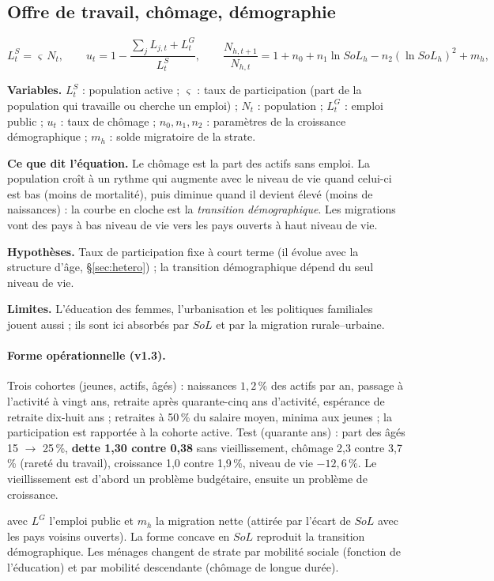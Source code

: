 \documentclass[11pt,a4paper]{article}
\newcommand{\variables}{\par\noindent\textbf{Variables.} }
\newcommand{\sens}{\par\noindent\textbf{Ce que dit l'équation.} }
\newcommand{\hyp}{\par\noindent\textbf{Hypothèses.} }
\newcommand{\limites}{\par\noindent\textbf{Limites.} }
\begin{document}
\subsection{Offre de travail, chômage, démographie}
\label{sec:demog}
\begin{equation}
L^S_t = \varsigma\, N_t, \qquad u_t = 1 - \frac{\sum_j L_{j,t} + L^G_t}{L^S_t}, \qquad
\frac{N_{h,t+1}}{N_{h,t}} = 1 + n_0 + n_1 \ln SoL_h - n_2 (\ln SoL_h)^2 + m_h ,
\end{equation}
\begin{lecture}
\variables $L^S_t$ : population active ; $\varsigma$ : taux de participation (part de la population qui travaille ou cherche un emploi) ; $N_t$ : population ; $L^G_t$ : emploi public ; $u_t$ : taux de chômage ; $n_0, n_1, n_2$ : paramètres de la croissance démographique ; $m_h$ : solde migratoire de la strate.
\sens Le chômage est la part des actifs sans emploi. La population croît à un rythme qui augmente avec le niveau de vie quand celui-ci est bas (moins de mortalité), puis diminue quand il devient élevé (moins de naissances) : la courbe en cloche est la \emph{transition démographique}. Les migrations vont des pays à bas niveau de vie vers les pays ouverts à haut niveau de vie.
\hyp Taux de participation fixe à court terme (il évolue avec la structure d'âge, \S\ref{sec:hetero}) ; la transition démographique dépend du seul niveau de vie.
\limites L'éducation des femmes, l'urbanisation et les politiques familiales jouent aussi ; ils sont ici absorbés par $SoL$ et par la migration rurale--urbaine.
\paragraph{Forme opérationnelle (v1.3).} Trois cohortes (jeunes, actifs, âgés) : naissances $1{,}2\,\%$ des actifs par an, passage à l'activité à vingt ans, retraite après quarante-cinq ans d'activité, espérance de retraite dix-huit ans ; retraites à 50\,\% du salaire moyen, minima aux jeunes ; la participation est rapportée à la cohorte active. Test (quarante ans) : part des âgés 15 $\to$ 25\,\%, \textbf{dette 1,30 contre 0,38} sans vieillissement, chômage 2,3 contre 3,7\,\% (rareté du travail), croissance 1,0 contre 1,9\,\%, niveau de vie $-12{,}6\,\%$. Le vieillissement est d'abord un problème budgétaire, ensuite un problème de croissance.
\end{lecture}
avec $L^G$ l'emploi public et $m_h$ la migration nette (attirée par l'écart de $SoL$ avec les pays voisins ouverts). La forme concave en $SoL$ reproduit la transition démographique. Les ménages changent de strate par mobilité sociale (fonction de l'éducation) et par mobilité descendante (chômage de longue durée).
\end{document}

